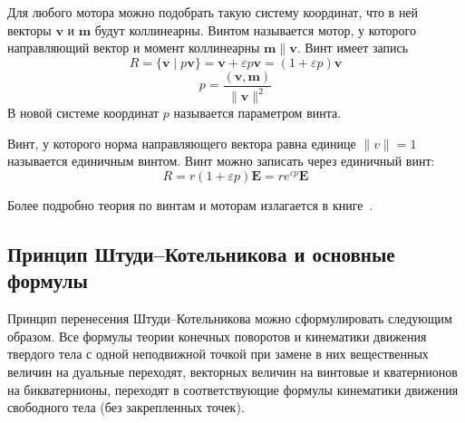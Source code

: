 \documentclass[%
]{ittmm}
\begin{document}
Для любого мотора можно подобрать такую систему координат, что в ней векторы $\mathbf{v}$ и $\mathbf{m}$ будут коллинеарны.
Винтом называется мотор, у которого направляющий вектор и момент коллинеарны $\mathbf{m} \| \mathbf{v}$. Винт имеет запись
\begin{equation*}
  R = \{ \mathbf{v} \mid p\mathbf{v} \} = \mathbf{v} + \varepsilon p \mathbf{v} = (1+\varepsilon p)\mathbf{v}
\end{equation*}
\begin{equation*}
  p=\frac{(\mathbf{v}, \mathbf{m})}{\| \mathbf{v} \|^2}
\end{equation*}
В новой системе координат $p$ называется параметром винта.

Винт, у которого норма направляющего вектора равна единице $\| v \| = 1$ называется единичным винтом. Винт можно записать через единичный винт:
\begin{equation*}
  R = r(1+\varepsilon p)\mathbf{E} = r e^{\varepsilon p}\mathbf{E}
\end{equation*}

Более подробно теория по винтам и моторам излагается в книге~\cite{Dimentberg:1965}.

\subsection{Принцип Штуди--Котельникова и основные формулы}

Принцип перенесения Штуди--Котельникова можно сформулировать следующим образом. Все формулы теории конечных поворотов и кинематики движения твердого тела с одной неподвижной точкой при замене в них вещественных величин на дуальные переходят, векторных величин на винтовые и кватернионов на бикватернионы, переходят в соответствующие формулы кинематики движения свободного тела (без закрепленных точек).
\end{document}
